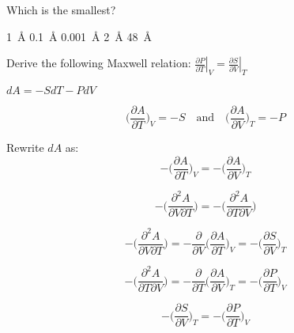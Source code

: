 \documentclass[12pt]{exam}
\begin{document}
\begin{questions}
\question Which is the smallest?
    \begin{choices}
	\choice \SI{1}{\angstrom}
	\choice \SI{0.1}{\angstrom}
	\CorrectChoice \SI{0.001}{\angstrom}
	\choice \SI{2}{\angstrom}
	\choice \SI{48}{\angstrom}
	\end{choices}

\question Derive the following Maxwell relation: $ \displaystyle \left.\frac{\partial P}{\partial T}\right|_{V}=\left.\frac{\partial S}{\partial V}\right|_{T} $

	\begin{solution}
	
	\begin{center}
	$ dA = - S dT - P d V $
	\end{center}
	
	\begin{equation*}
	\bigg( \frac{ \partial A}{ \partial T} \bigg)_{V} = -S \quad \text{and} \quad \bigg( \frac{ \partial A}{ \partial V} \bigg)_{T} = -P
	\end{equation*}
	
	Rewrite $dA$ as:
	\begin{equation*}
	- \bigg( \frac{ \partial A}{ \partial T} \bigg)_{V} =  - \bigg( \frac{ \partial A}{ \partial V} \bigg)_{T}
	\end{equation*}
	
	\begin{equation*}
	- \bigg( \frac{\partial^{2} A}{\partial V \partial T} \bigg) = - \bigg( \frac{\partial^{2} A}{\partial T \partial V} \bigg)
	\end{equation*}
	
	\begin{equation*}
	- \bigg( \frac{\partial^{2} A}{\partial V \partial T} \bigg) = - \frac{\partial}{\partial V} \bigg( \frac{\partial A}{\partial T} \bigg)_{V} = - \bigg( \frac{\partial S}{\partial V} \bigg)_{T}
	\end{equation*}
	
	\begin{equation*}
	- \bigg( \frac{\partial^{2} A}{\partial T \partial V} \bigg) = - \frac{\partial}{\partial T} \bigg( \frac{\partial A}{\partial V} \bigg)_{T} = - \bigg( \frac{\partial P}{\partial T} \bigg)_{V}
	\end{equation*}
	
	\begin{equation*}
	- \bigg( \frac{\partial S}{\partial V} \bigg)_{T} = - \bigg( \frac{\partial P}{\partial T} \bigg)_{V} 
	\end{equation*}
	

\end{solution}
\end{questions}
\end{document}
